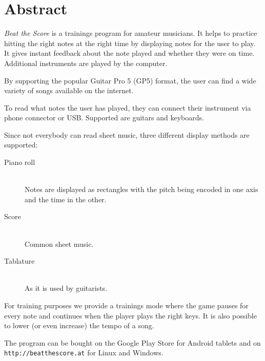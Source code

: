 \chapter{Abstract}

\emph{Beat the Score} is a trainings program for amateur musicians. It helps to practice hitting the right notes at the right time by displaying notes for the user to play. It gives instant feedback about the note played and whether they were on time. Additional instruments are played by the computer.

By supporting the popular Guitar Pro 5 (GP5) format, the user can find a wide variety of songs available on the internet. 

To read what notes the user has played, they can connect their instrument via phone connector or USB. Supported are guitars and keyboards.

Since not everybody can read sheet music, three different display methods are supported: 
\begin{description}
	\item[Piano roll] \hfil \\ Notes are displayed as rectangles with the pitch being encoded in one axis and the time in the other.
	\item[Score] \hfil \\ Common sheet music.
	\item[Tablature] \hfil \\ As it is used by guitarists.
\end{description}

For training purposes we provide a trainings mode where the game pauses for every note and continues when the player plays the right keys. It is also possible to lower (or even increase) the tempo of a song. 

The program can be bought on the Google Play Store for Android tablets and on {\tt http://beatthescore.at} for Linux and Windows.
